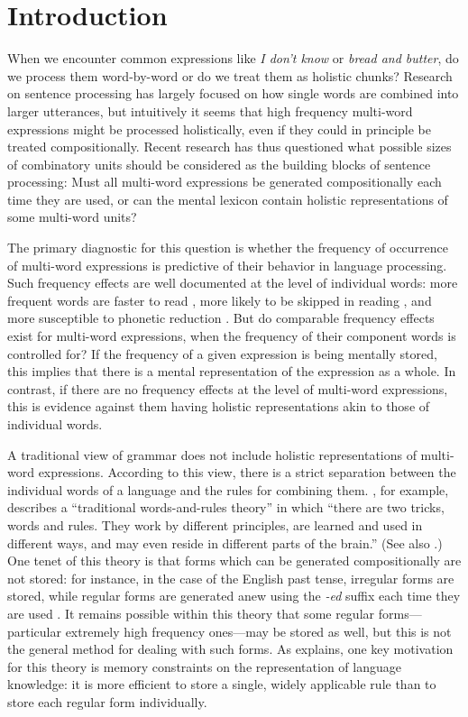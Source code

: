 \documentclass[authoryear]{elsarticle}
\begin{document}
\section{Introduction}
When we encounter common expressions like \emph{I don't know} or \emph{bread and butter}, do we process them word-by-word or do we treat them as holistic chunks? Research on sentence processing has largely focused on how single words are combined into larger utterances, but intuitively it seems that high frequency multi-word expressions might be processed holistically, even if they could in principle be treated compositionally. Recent research has thus questioned what possible sizes of combinatory units should be considered as the building blocks of sentence processing: Must all multi-word expressions be generated compositionally each time they are used, or can the mental lexicon contain holistic representations of some multi-word units?


The primary diagnostic for this question is whether the frequency of occurrence of multi-word expressions is predictive of their behavior in language processing. Such frequency effects are well documented at the level of individual words: more frequent words are faster to read \citep{Inhoff:1986vs,Rayner:1986ud,Rayner:1996wa}, more likely to be skipped in reading \citep{Rayner:1996wa,Rayner:1996vb}, and more susceptible to phonetic reduction \citep{Bybee:1999tm,Gregory:1999vs}. But do comparable frequency effects exist for multi-word expressions, when the frequency of their component words is controlled for? If the frequency of a given expression is being mentally stored, this implies that there is a mental representation of the expression as a whole. In contrast, if there are no frequency effects at the level of multi-word expressions, this is evidence against them having holistic representations akin to those of individual words.

A traditional view of grammar does not include holistic representations of multi-word expressions. According to this view, there is a strict separation between the individual words of a language and the rules for combining them. \citet{Pinker:2000wf}, for example, describes a ``traditional words-and-rules theory'' in which ``there are two tricks, words and rules. They work by different principles, are learned and used in different ways, and may even reside in different parts of the brain.'' (See also  \citealp{Ullman:2001vd, Ullman:2005jf}.) One tenet of this theory is that forms which can be generated compositionally are not stored: for instance, in the case of the English past tense, irregular forms are stored, while regular forms are generated anew using the \emph{-ed} suffix each time they are used \citep{Pinker:1991vn}. It remains possible within this theory that some regular forms---particular extremely high frequency ones---may be stored as well, but this is not the general method for dealing with such forms. As \citet{Pinker:2000wf} explains, one key motivation for this theory is memory constraints on the representation of language knowledge: it is more efficient to store a single, widely applicable rule than to store each regular form individually.
\end{document}
